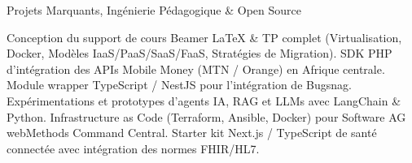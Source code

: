 \begin{rubric}{Projets Marquants, Ingénierie Pédagogique \& Open Source}

	Conception du support de cours Beamer LaTeX \& TP complet (Virtualisation, Docker, Modèles IaaS/PaaS/SaaS/FaaS, Stratégies de Migration).
	SDK PHP d'intégration des APIs Mobile Money (MTN / Orange) en Afrique centrale.
	Module wrapper TypeScript / NestJS pour l'intégration de Bugsnag.
	Expérimentations et prototypes d'agents IA, RAG et LLMs avec LangChain \& Python.
	Infrastructure as Code (Terraform, Ansible, Docker) pour Software AG webMethods Command Central.
	Starter kit Next.js / TypeScript de santé connectée avec intégration des normes FHIR/HL7.

\end{rubric}
